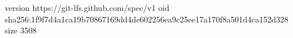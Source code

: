 version https://git-lfs.github.com/spec/v1
oid sha256:1f9f7d4a1ca19b70867169dd4de602256ea9c25ee17a170f8a501d4ca152d328
size 3508

